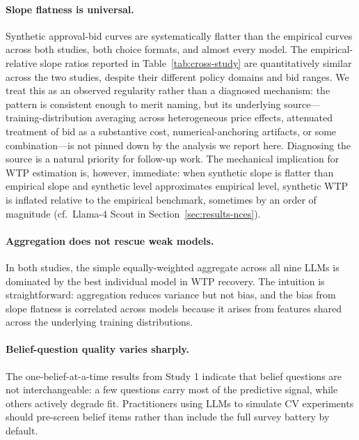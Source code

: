 \documentclass[12pt]{article}
\begin{document}
\paragraph{Slope flatness is universal.} Synthetic approval-bid curves
are systematically flatter than the empirical curves across both studies,
both choice formats, and almost every model. The empirical-relative slope
ratios reported in Table~\ref{tab:cross-study} are quantitatively similar
across the two studies, despite their different policy domains and bid
ranges. We treat this as an observed regularity rather than a diagnosed
mechanism: the pattern is consistent enough to merit naming, but its
underlying source---training-distribution averaging across heterogeneous
price effects, attenuated treatment of bid as a substantive cost,
numerical-anchoring artifacts, or some combination---is not pinned down
by the analysis we report here. Diagnosing the source is a natural
priority for follow-up work. The mechanical implication for WTP estimation
is, however, immediate: when synthetic slope is flatter than empirical
slope and synthetic level approximates empirical level, synthetic WTP is
inflated relative to the empirical benchmark, sometimes by an order of
magnitude (cf.~Llama-4 Scout in Section~\ref{sec:results-nces}).

\paragraph{Aggregation does not rescue weak models.} In both studies, the
simple equally-weighted aggregate across all nine LLMs is dominated by the
best individual model in WTP recovery. The intuition is straightforward:
aggregation reduces variance but not bias, and the bias from slope
flatness is correlated across models because it arises from features
shared across the underlying training distributions.

\paragraph{Belief-question quality varies sharply.} The
one-belief-at-a-time results from Study 1 indicate that belief questions
are not interchangeable: a few questions carry most of the predictive
signal, while others actively degrade fit. Practitioners using LLMs to
simulate CV experiments should pre-screen belief items rather than
include the full survey battery by default.
\end{document}
